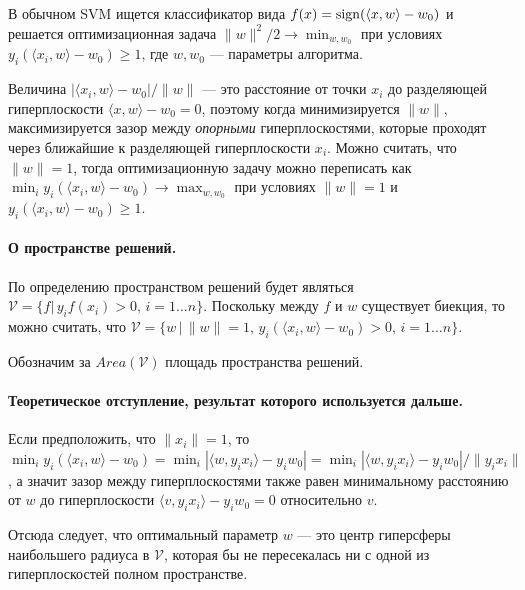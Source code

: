 \documentclass[specialist, 12pt, href]{article}
\begin{document}
В обычном SVM ищется классификатор вида
\(f(x) = {\rm sign}(\langle x, w \rangle - w_0)\) и решается
оптимизационная задача \(\|w\|^2/2 \to \min_{w, w_0}\) при условиях
\(y_i(\langle x_i, w \rangle - w_0) \geq 1\), где \(w, w_0\) ---
параметры алгоритма.

Величина \(|\langle x_i, w \rangle - w_0|/\|w\|\) --- это расстояние от
точки \(x_i\) до разделяющей гиперплоскости
\(\langle x, w \rangle - w_0 = 0\), поэтому когда минимизируется
\(\|w\|\), максимизируется зазор между \emph{опорными} гиперплоскостями,
которые проходят через ближайшие к разделяющей гиперплоскости \(x_i\).
Можно считать, что \(\|w\| = 1\), тогда оптимизационную задачу можно
переписать как
\(\min_i y_i (\langle x_i, w \rangle - w_0) \to \max_{w, w_0}\) при
условиях \(\|w\| = 1\) и \(y_i(\langle x_i, w \rangle - w_0) \geq 1\).

\paragraph{О пространстве
решений.}

По определению пространством решений будет являться
\(\mathcal{V} = \{f |\, y_if(x_i) > 0,\, i = 1 \ldots n\}\). Поскольку
между \(f\) и \(w\) существует биекция, то можно считать, что
\(\mathcal{V} = \{w\,|\, \|w\| = 1,\, y_i (\langle x_i, w \rangle - w_0) > 0,\, i = 1\ldots n \}\).

Обозначим за \(Area(\mathcal{V})\) площадь пространства решений.

\paragraph{Теоретическое отступление, результат которого используется
дальше.}

Если предположить, что \(\|x_i\| = 1\), то
\(\min_i y_i(\langle x_i, w \rangle - w_0) = \min_i |\langle w, y_i x_i\rangle - y_i w_0| = \min_i |\langle w, y_i x_i\rangle - y_i w_0|/\|y_ix_i\|\),
а значит зазор между гиперплоскостями также равен минимальному
расстоянию от \(w\) до гиперплоскости
\(\langle v, y_i x_i\rangle - y_i w_0 = 0\) относительно \(v\).

Отсюда следует, что оптимальный параметр \(w\) --- это центр гиперсферы
наибольшего радиуса в \(\mathcal{V}\), которая бы не пересекалась ни с
одной из гиперплоскостей полном пространстве.
\end{document}
